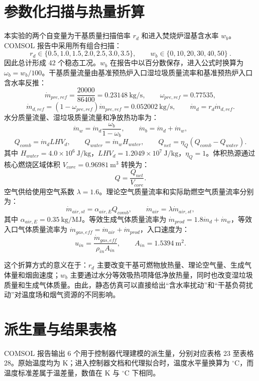 \documentclass[UTF8,openany,zihao=-4,oneside]{ctexbook}
\begin{document}
\section{参数化扫描与热量折算}

本实验的两个自变量为干基质量扫描倍率 $r_d$ 和进入焚烧炉湿基含水率 $w_b$。COMSOL 报告中采用所有组合扫描：
\[
 r_d\in\{0.5,1.0,1.5,2.0,2.5,3.0,3.5\},\qquad
 w_b\in\{0,10,20,30,40,50\}\ .
\]
因此总计形成 42 个稳态工况。$w_b$ 在报告中以百分数保存，进入公式时换算为 $\omega_b=w_b/100$。干基质量流量由基准预热炉入口湿垃圾质量流率和基准预热炉入口含水率反推：
\[
\dot m_{pre,ref}=\frac{20000}{86400}=0.23148\ \mathrm{kg/s},\qquad
\omega_{pre,ref}=0.77535,
\]
\[
\dot m_{d,ref}=(1-\omega_{pre,ref})\dot m_{pre,ref}=0.052002\ \mathrm{kg/s},\qquad
\dot m_d=r_d\dot m_{d,ref}.
\]
水分质量流量、湿垃圾质量流量和净放热功率为：
\[
\dot m_w=\dot m_d\frac{\omega_b}{1-\omega_b},\qquad
\dot m_b=\dot m_d+\dot m_w,
\]
\[
Q_{comb}=\dot m_d LHV_d,\qquad
Q_{water}=\dot m_wH_{water},\qquad
Q_{net}=\eta_Q(Q_{comb}-Q_{water}).
\]
其中 $H_{water}=4.0\times10^6\ \mathrm{J/kg}$，$LHV_d=1.2049\times10^7\ \mathrm{J/kg}$，$\eta_Q=1$。体积热源通过核心燃烧区域体积 $V_{core}=0.96981\ \mathrm{m^3}$ 转换为：
\[
Q=\frac{Q_{net}}{V_{core}}.
\]
空气供给使用空气系数 $\lambda=1.6$。理论空气质量流率和实际助燃空气质量流率分别为：
\[
\dot m_{air,st}=\alpha_{air,E}Q_{comb},\qquad
\dot m_{air}=\lambda\dot m_{air,st},
\]
其中 $\alpha_{air,E}=0.35\ \mathrm{kg/MJ}$。等效生成气体质量流率为 $\dot m_{prod}=1.8\dot m_d+\dot m_w$，等效入口气体质量流率为 $\dot m_{gas,eff}=\dot m_{air}+\dot m_{prod}$，入口速度为：
\[
 u_{in}=\frac{\dot m_{gas,eff}}{\rho_{in}A_{in}},\qquad
 A_{in}=1.5394\ \mathrm{m^2}.
\]

这个折算方式的意义在于：$r_d$ 主要改变干基可燃物放热量、理论空气量、生成气体量和烟囱速度；$w_b$ 主要通过水分等效吸热项降低净放热量，同时也改变湿垃圾质量和生成气体质量。由此，静态仿真可以直接给出“含水率扰动”和“干基负荷扰动”对温度场和烟气资源的不同影响。

\section{派生量与结果表格}

COMSOL 报告输出 6 个用于控制器代理建模的派生量，分别对应表格 23 至表格 28。原始温度均为 K；进入控制器文档和代理拟合时，温度水平量换算为 $^\circ\mathrm{C}$，而温度标准差属于温差量，数值在 K 与 $^\circ\mathrm{C}$ 下相同。
\end{document}
